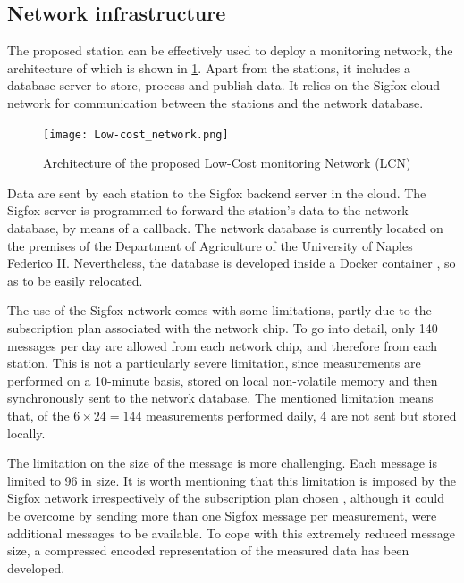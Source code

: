 \documentclass[authoryear,preprint,review,12pt]{elsarticle}
\begin{document}
\subsection{Network infrastructure}
The proposed station can be effectively used to deploy a monitoring network, the architecture of which is shown in \cref{fig:network}. Apart from the stations, it includes a database server to store, process and publish data. 
It relies on the Sigfox cloud network \cite{sigfox:network-architecture} for communication between the stations and the network database.

\begin{figure}
    \centering
    \texttt{[image: Low-cost\_network.png]}
    \caption{Architecture of the proposed Low-Cost monitoring Network (LCN)}
    \label{fig:network}
\end{figure}
Data are sent by each station to the Sigfox backend server in the cloud. The Sigfox server is programmed to forward the station's data to the network database, by means of a callback. The network database is currently located on the premises of the Department of Agriculture of the University of Naples Federico II. 
Nevertheless, the database is developed inside a Docker container \cite{docker:mainpage}, so as to be easily relocated.

The use of the Sigfox network comes with some limitations, partly due to the subscription plan associated with the network chip.
To go into detail, only 140 messages per day are allowed from each network chip, and therefore from each station. 
This is not a particularly severe limitation, since measurements are performed on a 10-minute basis, stored on local non-volatile memory and then synchronously sent to the network database. 
The mentioned limitation means that, of the  \(6\times 24 = 144\) measurements performed daily, 4 are not sent but stored locally.

The limitation on the size of the message is more challenging. 
Each message is limited to \SI{96}{\bit} in size. 
It is worth mentioning that this limitation is imposed by the Sigfox network irrespectively of the subscription plan chosen \cite{sigfox:network-architecture}, although it could be overcome by sending more than one Sigfox message per measurement, were additional messages to be available. 
To cope with this extremely reduced message size, a compressed encoded representation of the measured data has been developed. 
\end{document}
